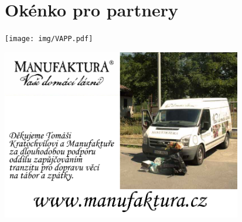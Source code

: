 \chapter{Okénko pro partnery} %
\label{cha:okénko_pro_partnery}

\begin{center}

\texttt{[image: img/VAPP.pdf]}
\vspace{5mm}

\includegraphics[width=10.5cm]{img/maunfaktura.pdf}

\end{center}

\clearpage